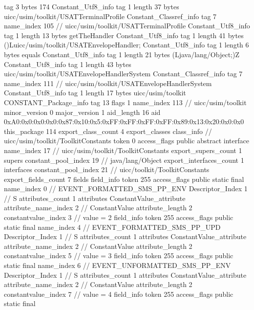 {{{			tag	3
			bytes	174
		}
		Constant_Utf8_info {
			tag	1
			length	37
			bytes	uicc/usim/toolkit/USATTerminalProfile
		}
		Constant_Classref_info {
			tag	7
			name_index	105		// uicc/usim/toolkit/USATTerminalProfile
		}
		Constant_Utf8_info {
			tag	1
			length	13
			bytes	getTheHandler
		}
		Constant_Utf8_info {
			tag	1
			length	41
			bytes	()Luicc/usim/toolkit/USATEnvelopeHandler;
		}
		Constant_Utf8_info {
			tag	1
			length	6
			bytes	equals
		}
		Constant_Utf8_info {
			tag	1
			length	21
			bytes	(Ljava/lang/Object;)Z
		}
		Constant_Utf8_info {
			tag	1
			length	43
			bytes	uicc/usim/toolkit/USATEnvelopeHandlerSystem
		}
		Constant_Classref_info {
			tag	7
			name_index	111		// uicc/usim/toolkit/USATEnvelopeHandlerSystem
		}
		Constant_Utf8_info {
			tag	1
			length	17
			bytes	uicc/usim/toolkit
		}
		CONSTANT_Package_info {
			tag	13
			flags	1
			name_index	113		// uicc/usim/toolkit
			minor_version	0
			major_version	1
			aid_length	16
			aid	0xA0:0x0:0x0:0x0:0x87:0x10:0x5:0xFF:0xFF:0xFF:0xFF:0x89:0x13:0x20:0x0:0x0
		}
	}
	this_package	114
	export_class_count	4
	export_classes {
		class_info {		// uicc/usim/toolkit/ToolkitConstants
			token	0
			access_flags	public abstract interface
			name_index	17		// uicc/usim/toolkit/ToolkitConstants
			export_supers_count	1
			supers {
				constant_pool_index	19		// java/lang/Object
			}
			export_interfaces_count	1
			interfaces {
				constant_pool_index	21		// uicc/toolkit/ToolkitConstants
			}
			export_fields_count	7
			fields {
			field_info {
				token	255
				access_flags	public static final
				name_index	0		// EVENT_FORMATTED_SMS_PP_ENV
				Descriptor_Index	1		// S
				attributes_count	1
				attributes {
				ConstantValue_attribute {
					attribute_name_index	2		// ConstantValue
					attribute_length	2
					constantvalue_index	3		// value = 2
				}
				}
			}
			field_info {
				token	255
				access_flags	public static final
				name_index	4		// EVENT_FORMATTED_SMS_PP_UPD
				Descriptor_Index	1		// S
				attributes_count	1
				attributes {
				ConstantValue_attribute {
					attribute_name_index	2		// ConstantValue
					attribute_length	2
					constantvalue_index	5		// value = 3
				}
				}
			}
			field_info {
				token	255
				access_flags	public static final
				name_index	6		// EVENT_UNFORMATTED_SMS_PP_ENV
				Descriptor_Index	1		// S
				attributes_count	1
				attributes {
				ConstantValue_attribute {
					attribute_name_index	2		// ConstantValue
					attribute_length	2
					constantvalue_index	7		// value = 4
				}
				}
			}
			field_info {
				token	255
				access_flags	public static final
}}}}}
